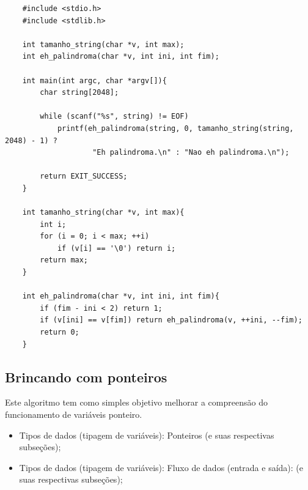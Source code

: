 \documentclass[12pt]{article}
\newcommand\tab[1][1cm]{\hspace*{#1}}
\begin{document}
\hspace{0.25cm}
\begin{lstlisting}
    #include <stdio.h>
    #include <stdlib.h>
    
    int tamanho_string(char *v, int max);
    int eh_palindroma(char *v, int ini, int fim);
    
    int main(int argc, char *argv[]){
    	char string[2048];
    	
        while (scanf("%s", string) != EOF)
    		printf(eh_palindroma(string, 0, tamanho_string(string, 2048) - 1) ?
    			   	"Eh palindroma.\n" : "Nao eh palindroma.\n");
    
        return EXIT_SUCCESS;
    }
    
    int tamanho_string(char *v, int max){
    	int i;
    	for (i = 0; i < max; ++i)
    		if (v[i] == '\0') return i;
    	return max;
    }
    
    int eh_palindroma(char *v, int ini, int fim){
    	if (fim - ini < 2) return 1;
    	if (v[ini] == v[fim]) return eh_palindroma(v, ++ini, --fim);
    	return 0;
    }
\end{lstlisting}

\newpage
\subsection{Brincando com ponteiros}

\par\tab Este algoritmo tem como simples objetivo melhorar a compreensão do funcionamento de variáveis ponteiro.

\hspace{0.25cm}
\begin{tcolorbox}[colback=violet!5!white,colframe=violet!75!white,title=Capítulos recomendados:]
    \begin{itemize}
        \item Tipos de dados (tipagem de variáveis): Ponteiros (e suas respectivas subseções);
        \item Tipos de dados (tipagem de variáveis): Fluxo de dados (entrada e saída): (e suas respectivas subseções);
    \end{itemize}
\end{tcolorbox}
\end{document}
